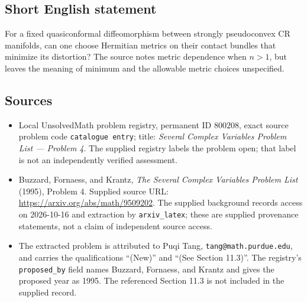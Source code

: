 \documentclass[11pt]{article}
\begin{document}
\subsection{Short English statement}
For a fixed quasiconformal diffeomorphism between strongly pseudoconvex CR manifolds, can one choose Hermitian metrics on their contact bundles that minimize its distortion? The source notes metric dependence when \(n>1\), but leaves the meaning of minimum and the allowable metric choices unspecified.
\subsection{Sources}
\begin{itemize}
\item Local UnsolvedMath problem registry, permanent ID \(800208\), exact source problem code \texttt{catalogue entry}; title: \emph{Several Complex Variables Problem List --- Problem 4}. The supplied registry labels the problem open; that label is not an independently verified assessment.
\item Buzzard, Fornaess, and Krantz, \emph{The Several Complex Variables Problem List} (1995), Problem 4. Supplied source URL: \url{https://arxiv.org/abs/math/9509202}. The supplied background records access on 2026-10-16 and extraction by \texttt{arxiv\_latex}; these are supplied provenance statements, not a claim of independent source access.
\item The extracted problem is attributed to Puqi Tang, \texttt{tang@math.purdue.edu}, and carries the qualifications ``(New)'' and ``(See Section 11.3)''. The registry's \texttt{proposed\_by} field names Buzzard, Fornaess, and Krantz and gives the proposed year as 1995. The referenced Section 11.3 is not included in the supplied record.
\end{itemize}
\end{document}
